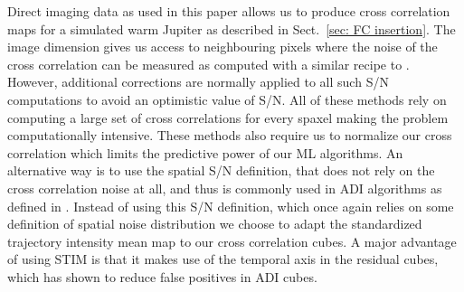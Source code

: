 \documentclass{aa}
\begin{document}
Direct imaging data as used in this paper allows us to produce cross correlation maps for a simulated warm Jupiter as described in Sect.~\ref{sec: FC insertion}.
The image dimension gives us access to neighbouring pixels where the noise of the cross correlation can be measured as computed with a similar recipe to \citet{2022Patapis}.
However, additional corrections are normally applied to all such S/N computations to avoid an optimistic value of S/N.
All of these methods rely on computing a large set of cross correlations for every spaxel making the problem computationally intensive.
These methods also require us to normalize our cross correlation which limits the predictive power of our ML algorithms.
An alternative way is to use the spatial S/N definition, that does not rely on the cross correlation noise at all, and thus is commonly used in ADI algorithms as defined in \citet{2014MawetSNR}.
Instead of using this S/N definition, which once again relies on some definition of spatial noise distribution we choose to adapt the standardized trajectory intensity mean \citep[STIM,][]{2019Pairet} map to our cross correlation cubes. 
A major advantage of using STIM is that it makes use of the temporal axis in the residual cubes, which has shown to reduce false positives in ADI cubes.
\end{document}
